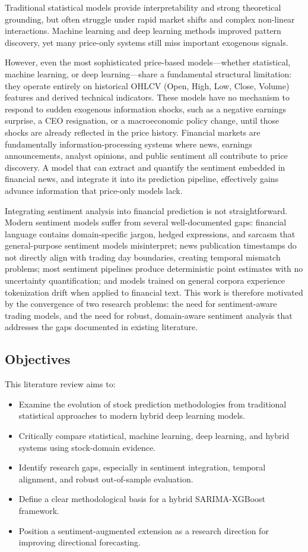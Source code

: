 \documentclass[12pt,a4paper]{article}
\begin{document}
Traditional statistical models provide interpretability and strong theoretical grounding, but often struggle under rapid market shifts and complex non-linear interactions. Machine learning and deep learning methods improved pattern discovery, yet many price-only systems still miss important exogenous signals.

However, even the most sophisticated price-based models---whether statistical, machine learning, or deep learning---share a fundamental structural limitation: they operate entirely on historical OHLCV (Open, High, Low, Close, Volume) features and derived technical indicators. These models have no mechanism to respond to sudden exogenous information shocks, such as a negative earnings surprise, a CEO resignation, or a macroeconomic policy change, until those shocks are already reflected in the price history. Financial markets are fundamentally information-processing systems where news, earnings announcements, analyst opinions, and public sentiment all contribute to price discovery. A model that can extract and quantify the sentiment embedded in financial news, and integrate it into its prediction pipeline, effectively gains advance information that price-only models lack.

Integrating sentiment analysis into financial prediction is not straightforward. Modern sentiment models suffer from several well-documented gaps: financial language contains domain-specific jargon, hedged expressions, and sarcasm that general-purpose sentiment models misinterpret; news publication timestamps do not directly align with trading day boundaries, creating temporal mismatch problems; most sentiment pipelines produce deterministic point estimates with no uncertainty quantification; and models trained on general corpora experience tokenization drift when applied to financial text. This work is therefore motivated by the convergence of two research problems: the need for sentiment-aware trading models, and the need for robust, domain-aware sentiment analysis that addresses the gaps documented in existing literature.

\subsection{Objectives}
This literature review aims to:
\begin{itemize}
    \item Examine the evolution of stock prediction methodologies from traditional statistical approaches to modern hybrid deep learning models.
    \item Critically compare statistical, machine learning, deep learning, and hybrid systems using stock-domain evidence.
    \item Identify research gaps, especially in sentiment integration, temporal alignment, and robust out-of-sample evaluation.
    \item Define a clear methodological basis for a hybrid SARIMA-XGBoost framework.
    \item Position a sentiment-augmented extension as a research direction for improving directional forecasting.
\end{itemize}
\end{document}
